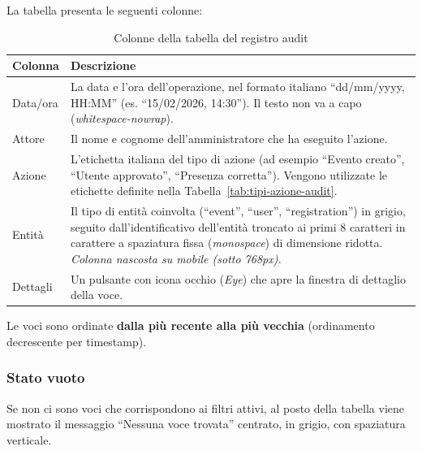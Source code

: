 \documentclass[a4paper,11pt,oneside]{book}
\begin{document}
La tabella presenta le seguenti colonne:

\begin{table}[htbp]
\centering
\caption{Colonne della tabella del registro audit}
\label{tab:colonne-audit}
\begin{tabularx}{\textwidth}{l X}
\toprule
\textbf{Colonna} & \textbf{Descrizione} \\
\midrule
Data/ora  & La data e l'ora dell'operazione, nel formato italiano ``dd/mm/yyyy, HH:MM'' (es. ``15/02/2026, 14:30''). Il testo non va a capo (\textit{whitespace-nowrap}). \\
Attore    & Il nome e cognome dell'amministratore che ha eseguito l'azione. \\
Azione    & L'etichetta italiana del tipo di azione (ad esempio ``Evento creato'', ``Utente approvato'', ``Presenza corretta''). Vengono utilizzate le etichette definite nella Tabella~\ref{tab:tipi-azione-audit}. \\
Entit\`a   & Il tipo di entit\`a coinvolta (``event'', ``user'', ``registration'') in grigio, seguito dall'identificativo dell'entit\`a troncato ai primi 8 caratteri in carattere a spaziatura fissa (\textit{monospace}) di dimensione ridotta. \textit{Colonna nascosta su mobile (sotto 768px).} \\
Dettagli  & Un pulsante con icona occhio (\textit{Eye}) che apre la finestra di dettaglio della voce. \\
\bottomrule
\end{tabularx}
\end{table}

Le voci sono ordinate \textbf{dalla pi\`u recente alla pi\`u vecchia} (ordinamento decrescente per timestamp).

\subsubsection{Stato vuoto}

Se non ci sono voci che corrispondono ai filtri attivi, al posto della tabella viene mostrato il messaggio ``Nessuna voce trovata'' centrato, in grigio, con spaziatura verticale.
\end{document}
